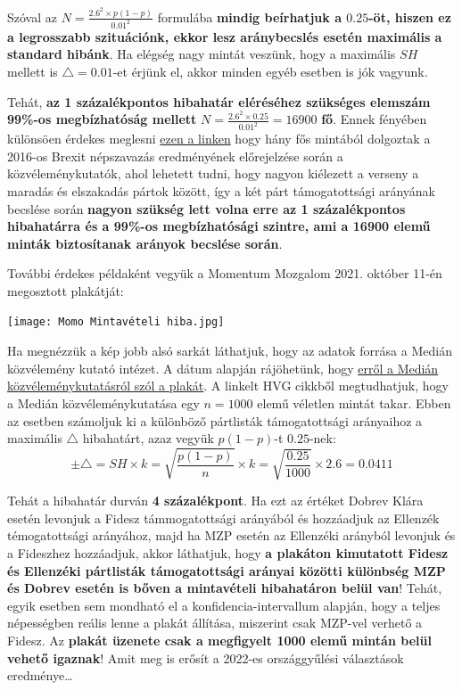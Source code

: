 \documentclass[
]{book}
\begin{document}
Szóval az \(N=\frac{2.6^2 \times p(1-p)}{0.01^2}\) formulába \textbf{mindig beírhatjuk a \(0.25\)-öt, hiszen ez a legrosszabb szituációnk, ekkor lesz aránybecslés esetén maximális a standard hibánk}. Ha elégség nagy mintát veszünk, hogy a maximális \(SH\) mellett is \(\triangle = 0.01\)-et érjünk el, akkor minden egyéb esetben is jók vagyunk.

Tehát, \textbf{az 1 százalékpontos hibahatár eléréséhez szükséges elemszám 99\%-os megbízhatóság mellett} \(N=\frac{2.6^2 \times 0.25}{0.01^2}=16900\) \textbf{fő}.
Ennek fényében különsöen érdekes meglesni \href{https://ig.ft.com/sites/brexit-polling/}{ezen a linken} hogy hány fős mintából dolgoztak a 2016-os Brexit népszavazás eredményének előrejelzése során a közvéleménykutatók, ahol lehetett tudni, hogy nagyon kiélezett a verseny a maradás és elszakadás pártok között, így a két párt támogatottsági arányának becslése során \textbf{nagyon szükség lett volna erre az 1 százalékpontos hibahatárra és a 99\%-os megbízhatósági szintre, ami a 16900 elemű minták biztosítanak arányok becslése során}.

További érdekes példaként vegyük a Momentum Mozgalom 2021. október 11-én megosztott plakátját:

\texttt{[image: Momo Mintavételi hiba.jpg]}

Ha megnézzük a kép jobb alsó sarkát láthatjuk, hogy az adatok forrása a Medián közvélemény kutató intézet. A dátum alapján rájöhetünk, hogy \href{https://hvg.hu/itthon/20211011_Median_MarkiZay_elonyhoz_juttathatja_az_ellenzeket}{erről a Medián közvéleménykutatásról szól a plakát}. A linkelt HVG cikkből megtudhatjuk, hogy a Medián közvéleménykutatása egy \(n=1000\) elemű véletlen mintát takar. Ebben az esetben számoljuk ki a különböző pártlisták támogatottsági arányaihoz a maximális \(\triangle\) hibahatárt, azaz vegyük \(p(1-p)\)-t \(0.25\)-nek:\[\pm \triangle = SH \times k = \sqrt{\frac{p(1-p)}{n}} \times k = \sqrt{\frac{0.25}{1000}} \times 2.6=0.0411\]

Tehát a hibahatár durván \textbf{4 százalékpont}. Ha ezt az értéket Dobrev Klára esetén levonjuk a Fidesz támmogatottsági arányából és hozzáadjuk az Ellenzék témogatottsági arányához, majd ha MZP esetén az Ellenzéki arányból levonjuk és a Fideszhez hozzáadjuk, akkor láthatjuk, hogy \textbf{a plakáton kimutatott Fidesz és Ellenzéki pártlisták támogatottsági arányai közötti különbség MZP és Dobrev esetén is bőven a mintavételi hibahatáron belül van}!
Tehát, egyik esetben sem mondható el a konfidencia-intervallum alapján, hogy a teljes népességben reális lenne a plakát állítása, miszerint csak MZP-vel verhető a Fidesz. Az \textbf{plakát üzenete csak a megfigyelt 1000 elemű mintán belül vehető igaznak}! Amit meg is erősít a 2022-es országgyűlési választások eredménye\ldots{}
\end{document}
